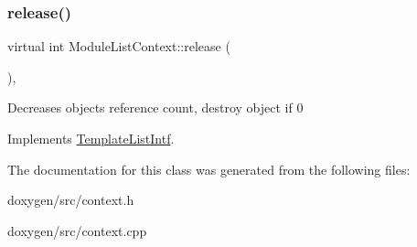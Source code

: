 \mbox{\label{class_module_list_context_a43785b9c64132a617e587d0181a5f4ae}} 
\subsubsection{\texorpdfstring{release()}{release()}}
{\footnotesize\ttfamily virtual int Module\+List\+Context\+::release (\begin{DoxyParamCaption}{ }\end{DoxyParamCaption})\hspace{0.3cm}{\ttfamily [inline]}, {\ttfamily [virtual]}}

Decreases object\textquotesingle{}s reference count, destroy object if 0 

Implements \mbox{\hyperlink{class_template_list_intf_a0c53169c740c09dac47efc62bbe39674}{Template\+List\+Intf}}.



The documentation for this class was generated from the following files\+:\begin{DoxyCompactItemize}
\item 
doxygen/src/context.\+h\item 
doxygen/src/context.\+cpp\end{DoxyCompactItemize}
